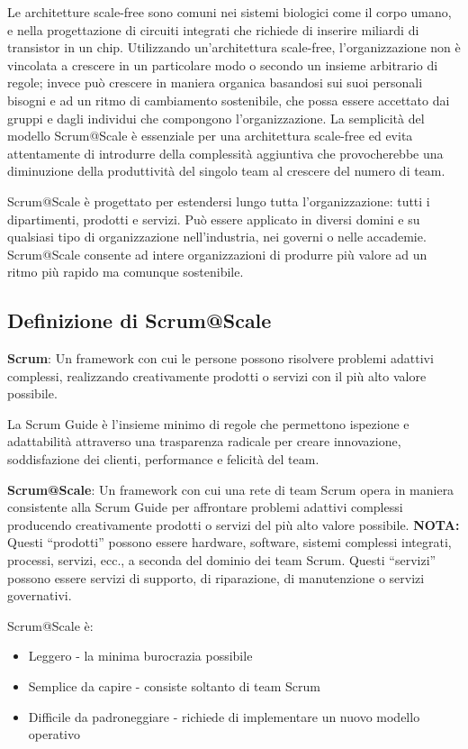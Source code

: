 \documentclass[italian,12pt,a4paper,parskip=full]{scrartcl}
\begin{document}
Le architetture scale-free sono comuni nei sistemi biologici come il corpo umano, e nella progettazione di circuiti integrati che richiede di inserire miliardi di transistor in un chip. Utilizzando un'architettura scale-free, l'organizzazione non è 
vincolata a crescere in un particolare modo o secondo un insieme arbitrario di
regole; invece può crescere in maniera organica basandosi sui suoi personali
bisogni e ad un ritmo di cambiamento sostenibile, che possa essere 
accettato dai gruppi e dagli individui che compongono l'organizzazione. La semplicità del modello Scrum@Scale è essenziale per una architettura scale-free ed evita attentamente di introdurre della complessità aggiuntiva che provocherebbe una diminuzione della produttività del singolo team al crescere del numero di team.

Scrum@Scale è progettato per estendersi lungo tutta l'organizzazione: tutti
i dipartimenti, prodotti e servizi. Può essere applicato in diversi domini
e su qualsiasi tipo di organizzazione nell'industria, nei governi o nelle accademie. Scrum@Scale consente ad intere organizzazioni di produrre più valore ad un ritmo più rapido ma comunque sostenibile.

\subsection{Definizione di Scrum@Scale}
\textbf{Scrum}: Un framework con cui le persone possono risolvere problemi adattivi complessi,
realizzando creativamente prodotti o servizi con il più alto valore possibile.

La Scrum Guide è l'insieme minimo di regole che permettono ispezione e adattabilità
attraverso una trasparenza radicale per creare innovazione, soddisfazione dei clienti,
performance e felicità del team.

\textbf{Scrum@Scale}: Un framework con cui una rete di team Scrum opera in maniera consistente
alla Scrum Guide per affrontare problemi adattivi complessi producendo creativamente prodotti  o servizi del più alto valore possibile.
\textbf{NOTA:} Questi ``prodotti'' possono essere hardware, software, sistemi complessi integrati, processi, servizi, ecc., a seconda del dominio dei team Scrum. Questi “servizi” possono essere servizi di supporto, di riparazione, di manutenzione o servizi governativi.
 
Scrum@Scale è:
\begin{itemize}
\item Leggero - la minima burocrazia possibile
\item Semplice da capire - consiste soltanto di team Scrum
\item Difficile da padroneggiare - richiede di implementare un nuovo modello operativo
\end{itemize}
\end{document}
